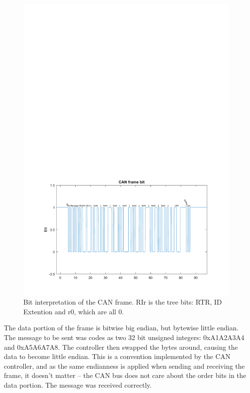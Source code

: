 \begin{figure}[h]
	\centering
	\includegraphics[width = \linewidth]{graphics/CAN_test1_message}
	\caption{Bit interpretation of the CAN frame. RIr  is the tree bits: RTR, ID Extention and r0, which are all 0.}
	\label{fig:CAN_test1_message}
\end{figure}

The data portion of the frame is bitwise big endian, but bytewise little endian. 
The message to be sent was codes as two 32 bit unsigned integers: 0xA1A2A3A4 and 0xA5A6A7A8.
The controller then swapped the bytes around, causing the data to become little endian.
This is a convention implemented by the CAN controller, and as the same endianness is applied when sending and receiving the frame, it doesn't matter -- the CAN bus does not care about the order bits in the data portion. 
The message was received correctly.\\

